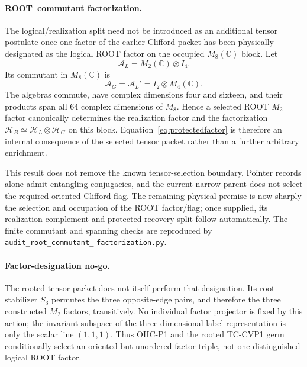 \paragraph{ROOT--commutant factorization.}
The logical/realization split need not be introduced as an additional tensor
postulate once one factor of the earlier Clifford packet has been physically
designated as the logical ROOT factor on the occupied $M_8(\mathbb C)$ block. Let
\begin{equation}
 \mathcal A_L=M_2(\mathbb C)\otimes I_4.
\end{equation}
Its commutant in $M_8(\mathbb C)$ is
\begin{equation}
 \mathcal A_G=\mathcal A_L'=I_2\otimes M_4(\mathbb C).
 \label{eq:rootcommutant}
\end{equation}
The algebras commute, have complex dimensions four and sixteen, and their
products span all $64$ complex dimensions of $M_8$. Hence a selected ROOT
$M_2$ factor canonically determines the realization factor and the
factorization $\mathcal H_B\simeq\mathcal H_L\otimes\mathcal H_G$ on this
block. Equation~\eqref{eq:protectedfactor} is therefore an internal
consequence of the selected tensor packet rather than a further arbitrary
enrichment.

This result does not remove the known tensor-selection boundary. Pointer
records alone admit entangling conjugacies, and the current narrow parent does
not select the required oriented Clifford flag. The remaining physical
premise is now sharply the selection and occupation of the ROOT factor/flag;
once supplied, its realization complement and protected-recovery split follow
automatically. The finite commutant and spanning checks are reproduced by
\texttt{audit\_root\_commutant\_}\allowbreak
\texttt{factorization.py}.

\paragraph{Factor-designation no-go.}
The rooted tensor packet does not itself perform that designation. Its root
stabilizer $S_3$ permutes the three opposite-edge pairs, and therefore the
three constructed $M_2$ factors, transitively. No individual factor projector
is fixed by this action; the invariant subspace of the three-dimensional
label representation is only the scalar line $(1,1,1)$. Thus OHC-P1 and the
rooted TC-CVP1 germ conditionally select an oriented but unordered factor
triple, not one distinguished logical ROOT factor.

